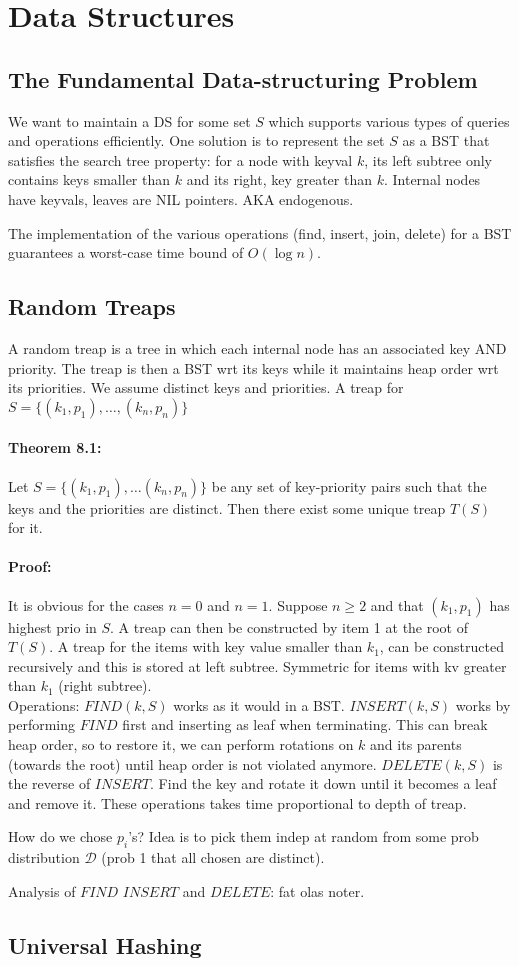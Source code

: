 \documentclass[a4paper]{article}
\begin{document}
\section{Data Structures}
\subsection{The Fundamental Data-structuring Problem}
\label{sub:The Fundamental Data-structuring Problem}
We want to maintain a DS for some set $S$ which supports various types of queries and operations efficiently. One solution is to represent the set $S$ as a BST that satisfies the search tree property: for a node with keyval $k$, its left subtree only contains keys smaller than $k$ and its right, key greater than $k$. Internal nodes have keyvals, leaves are NIL pointers. AKA endogenous.

The implementation of the various operations (find, insert, join, delete) for a BST guarantees a worst-case time bound of $O(\log n)$.
\subsection{Random Treaps}
\label{sub:Random Treaps}
A random treap is a tree in which each internal node has an associated key AND priority. The treap is then a BST wrt its keys while it maintains heap order wrt its priorities. We assume distinct keys and priorities. A treap for $S=\{(k_1,p_1),\ldots, (k_n,p_n)\}$
\paragraph{Theorem 8.1:} Let $S=\{(k_1,p_1),\ldots(k_n,p_n)\}$ be any set of key-priority pairs such that the keys and the priorities are distinct. Then there exist some unique treap $T(S)$ for it.
\paragraph{Proof:} It is obvious for the cases $n=0$ and $n=1$. Suppose $n\geq 2$ and that $(k_1,p_1)$ has highest prio in $S$. A treap can then be constructed by item 1 at the root of $T(S)$. A treap for the items with key value smaller than $k_1$, can be constructed recursively and this is stored at left subtree. Symmetric for items with kv greater than $k_1$ (right subtree).\\

Operations: $FIND(k,S)$ works as it would in a BST. $INSERT(k,S)$ works by performing $FIND$ first and inserting as leaf when terminating. This can break heap order, so to restore it, we can perform rotations on $k$ and its parents (towards the root) until heap order is not violated anymore. $DELETE(k,S)$ is the reverse of $INSERT$. Find the key and rotate it down until it becomes a leaf and remove it. These operations takes time proportional to depth of treap.

How do we chose $p_i$'s? Idea is to pick them indep at random from some prob distribution $\mathcal{D}$ (prob 1 that all chosen are distinct).

Analysis of $FIND$ $INSERT$ and $DELETE$: fat olas noter.
\subsection{Universal Hashing}
\label{sub:Universal Hashing}
\end{document}
